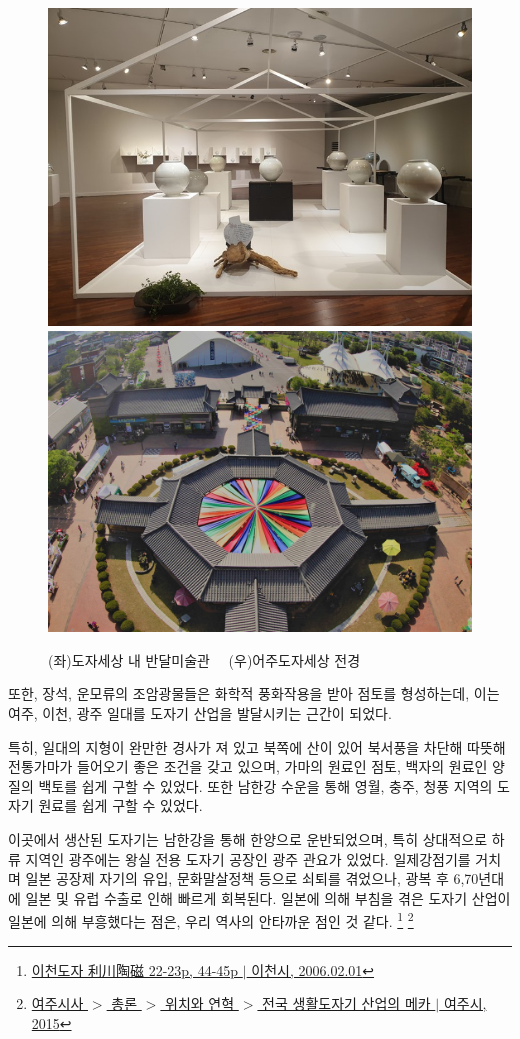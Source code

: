  \begin{figure}
    \centering
    \includegraphics[width=.4\textwidth]{img/도자전.jpg}
    \includegraphics[width=.4\textwidth]{img/여주도자세상.jpg}
    \caption{(좌)도자세상 내 반달미술관\protect\footnotemark $\quad$ (우)어주도자세상 전경\protect\footnotemark}
    \label{fig:my_labe3}
\end{figure}

또한, 장석, 운모류의 조암광물들은 화학적 풍화작용을 받아 점토를 형성하는데,
이는  여주, 이천, 광주 일대를 도자기 산업을 발달시키는 근간이 되었다.

특히, 일대의 지형이 완만한 경사가 져 있고
북쪽에 산이 있어 북서풍을 차단해 따뜻해 전통가마가 들어오기 좋은 조건을 갖고 있으며,
가마의 원료인 점토, 백자의 원료인 양질의 백토를 쉽게 구할 수 있었다.
또한 남한강 수운을 통해 영월, 충주, 청풍 지역의 도자기 원료를 쉽게 구할 수 있었다.

이곳에서 생산된 도자기는 남한강을 통해 한양으로 운반되었으며,
특히 상대적으로 하류 지역인 광주에는 왕실 전용 도자기 공장인 광주 관요가 있었다.
일제강점기를 거치며 일본 공장제 자기의 유입, 문화말살정책 등으로 쇠퇴를 겪었으나,
광복 후 6,70년대에 일본 및 유럽 수출로 인해 빠르게 회복된다.
일본에 의해 부침을 겪은 도자기 산업이 일본에 의해 부흥했다는 점은, 우리 역사의 안타까운 점인 것 같다.
\footnote{\href{https://memory.library.kr/items/show/37951}{이천도자 利川陶磁 22-23p, 44-45p $|$ 이천시, 2006.02.01}}
\footnote{ \href{https://www.yeoju.go.kr/history/main.jsp}{여주시사 $>$ 총론 $>$ 위치와 연혁 $>$ 전국 생활도자기 산업의 메카 $|$ 여주시, 2015}}

